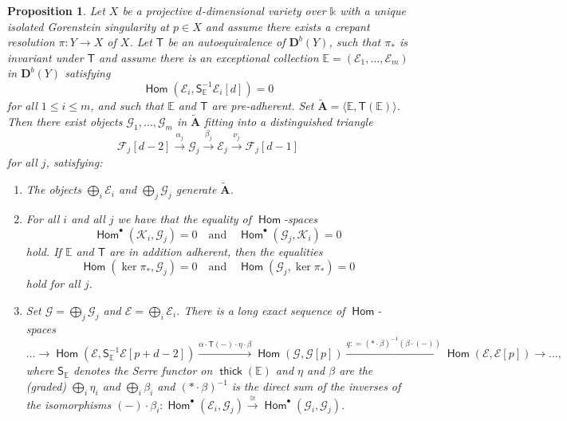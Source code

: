 \documentclass[a4paper,11pt, reqno]{amsart}
\def\E{\mathbb E}
\def\AA{\mathbf A}
\def\DD{\mathbf D}
\def\sE{\mathscr{E}}
\def\sF{\mathscr{F}}
\def\sG{\mathscr{G}}
\def\sK{\mathscr{K}}
\newcommand{\opname}[1]{\operatorname{\mathsf{#1}}}
\newcommand{\Hom}{\opname{Hom}}
\newcommand{\thick}{\opname{thick}\nolimits}
\def\Db{\DD^b}
\newcommand{\bS}{\mathsf{S}}
\newcommand{\bT}{\mathsf{T}}
\theoremstyle{plain}
\newtheorem{proposition}[dummy]{Proposition}
\theoremstyle{definition}
\numberwithin{equation}{section}
\newlength{\arrow}
\begin{document}
\begin{proposition}\label{prop:G}
    Let $X$ be a projective $d$-dimensional variety over $\mathbb{k}$ with a unique isolated Gorenstein singularity at $p \in X$ and assume there exists a crepant resolution $\pi \colon Y \to X$ of $X$.
Let $\bT$ be an autoequivalence of $\Db(Y)$, such that $\pi_\ast$ is invariant under $\bT $ and assume there is an exceptional collection $\E = (  \sE_1 , \ldots , \sE_m )$ in $\Db(Y)$ satisfying
\[
\Hom ( \sE_i , \bS^{-1}_\E \sE_i [d] ) = 0
\]
for all $1\leq i  \leq m$,
and such that $\E$ and $\bT$ are pre-adherent. Set $\tilde{\AA} = \langle \E , \bT ( \E ) \rangle$.
Then there exist objects $\sG_1 , \ldots , \sG_m$ in $\tilde{\AA}$ fitting into a distinguished triangle
    \begin{equation}\label{eq:tilting-triangle}
        \sF_j[d-2] \xrightarrow{\alpha_j} \sG_j \xrightarrow{\beta_j} \sE_j \xrightarrow{\nu_j } \sF_j [d-1]
    \end{equation}
    for all $j$, satisfying:
\begin{enumerate}
    \item\label{lem:G-a} The objects $\bigoplus_i \sE_i$ and $\bigoplus_j \sG_j$ generate $\tilde{\AA}$.
    \item\label{lem:G-b} For all $i$ and all $j$ we have that the equality of $\Hom$-spaces
    \begin{equation}\label{eq:orthogonality-K-G}
            \Hom^\bullet ( \sK_i , \sG_j ) = 0  \quad \text{and} \quad \Hom^\bullet ( \sG_j , \sK_i) = 0
    \end{equation}
    hold.
    If $\E$ and $\bT$ are in addition adherent, then the equalities
    \begin{equation}\label{eq:orthogonality-K-G-adherent}
        \Hom ( \ker\pi_\ast , \sG_j ) = 0  \quad \text{and} \quad \Hom ( \sG_j , \ker\pi_\ast ) = 0    
    \end{equation}
    hold for all $j$.
    \item\label{lem:G-c} Set $\sG = \bigoplus_j \sG_j$ and $\sE= \bigoplus_i \sE_i$.
    There is a long exact sequence of $\Hom$-spaces
    \begin{equation}\label{eq:les-G}
            \ldots \to \Hom( \sE , \bS^{-1}_{\E} \sE [p+d-2] ) \xrightarrow{\alpha \cdot \bT(-) \cdot \eta \cdot \beta} \Hom ( \sG , \sG [p] ) \xrightarrow{q : = ( \ast \cdot \beta )^{-1} (\beta \cdot  (-) )} \Hom ( \sE , \sE [p] ) \to \ldots ,
    \end{equation}
    where $\bS_{\E}$ denotes the Serre functor on $\thick ( \E )$ and $\eta$ and $\beta$ are the (graded)  $\bigoplus_i \eta_i $ and $  \bigoplus_i \beta_i$ and $(\ast \cdot \beta)^{-1}$ is the direct sum of the inverses of the isomorphisms $(-)\cdot \beta_i \colon \Hom^\bullet ( \sE_i , \sG_j ) \xrightarrow{\cong} \Hom^\bullet ( \sG_i , \sG_j  )$.
\end{enumerate}
\end{proposition}
\end{document}
